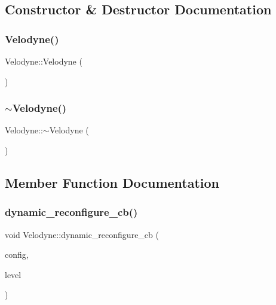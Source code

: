\subsection{Constructor \& Destructor Documentation}
\mbox{\label{classVelodyne_aea299a13d4d1de508599627f52cf958c}} 
\subsubsection{\texorpdfstring{Velodyne()}{Velodyne()}}
{\footnotesize\ttfamily Velodyne\+::\+Velodyne (\begin{DoxyParamCaption}{ }\end{DoxyParamCaption})}

\mbox{\label{classVelodyne_a4e6654c8d061f82a062af273d75bbede}} 
\subsubsection{\texorpdfstring{$\sim$\+Velodyne()}{~Velodyne()}}
{\footnotesize\ttfamily Velodyne\+::$\sim$\+Velodyne (\begin{DoxyParamCaption}{ }\end{DoxyParamCaption})}



\subsection{Member Function Documentation}
\mbox{\label{classVelodyne_a1a2fc80abf53b67444e0d6cc6916271a}} 
\subsubsection{\texorpdfstring{dynamic\+\_\+reconfigure\+\_\+cb()}{dynamic\_reconfigure\_cb()}}
{\footnotesize\ttfamily void Velodyne\+::dynamic\+\_\+reconfigure\+\_\+cb (\begin{DoxyParamCaption}\item[{dynamic\+\_\+obstacle\+\_\+tracking\+::velodyne\+Config \&}]{config,  }\item[{uint32\+\_\+t}]{level }\end{DoxyParamCaption})\hspace{0.3cm}{\ttfamily [private]}}

